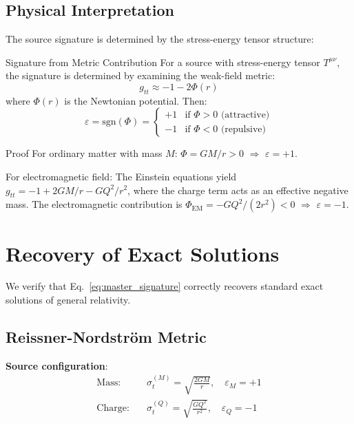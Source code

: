 \documentclass[11pt,a4paper]{article}
\theoremstyle{definition}
\theoremstyle{remark}
\begin{document}
	\subsection{Physical Interpretation}
	
	The source signature is determined by the stress-energy tensor structure:
	
	Signature from Metric Contribution
		\label{prop:signature_metric}
		For a source with stress-energy tensor $T^{\mu\nu}$, the signature is determined by examining the weak-field metric:
		\begin{equation}
			g_{tt} \approx -1 - 2\Phi(r)
		\end{equation}
		where $\Phi(r)$ is the Newtonian potential. Then:
		\begin{equation}
			\varepsilon = \text{sgn}(\Phi) = \begin{cases}
				+1 & \text{if } \Phi > 0 \text{ (attractive)} \\
				-1 & \text{if } \Phi < 0 \text{ (repulsive)}
			\end{cases}
		\end{equation}
	
	Proof
		For ordinary matter with mass $M$: $\Phi = GM/r > 0$ $\Rightarrow$ $\varepsilon = +1$.
		
		For electromagnetic field: The Einstein equations yield $g_{tt} = -1 + 2GM/r - GQ^2/r^2$, where the charge term acts as an effective negative mass. The electromagnetic contribution is $\Phi_{\text{EM}} = -GQ^2/(2r^2) < 0$ $\Rightarrow$ $\varepsilon = -1$.
	
	\section{Recovery of Exact Solutions}
	
	We verify that Eq.~\eqref{eq:master_signature} correctly recovers standard exact solutions of general relativity.
	
	\subsection{Reissner-Nordström Metric}
	
	\textbf{Source configuration}:
	\begin{align}
		\text{Mass:} \quad & \sigma_t^{(M)} = \sqrt{\frac{2GM}{r}}, \quad \varepsilon_M = +1 \label{eq:rn_mass} \\
		\text{Charge:} \quad & \sigma_t^{(Q)} = \sqrt{\frac{GQ^2}{r^2}}, \quad \varepsilon_Q = -1 \label{eq:rn_charge}
	\end{align}
	
\end{document}
